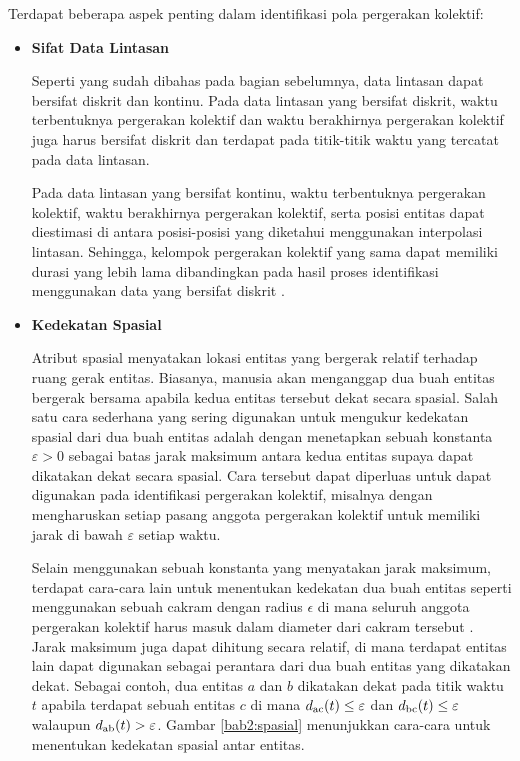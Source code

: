 Terdapat beberapa aspek penting dalam identifikasi pola pergerakan kolektif:

\begin{itemize}
    \item \textbf{Sifat Data Lintasan}
    
    Seperti yang sudah dibahas pada bagian sebelumnya, data lintasan dapat bersifat diskrit dan kontinu. Pada data lintasan yang bersifat diskrit, waktu terbentuknya pergerakan kolektif dan waktu berakhirnya pergerakan kolektif juga harus bersifat diskrit dan terdapat pada titik-titik waktu yang tercatat pada data lintasan.
    
    Pada data lintasan yang bersifat kontinu, waktu terbentuknya pergerakan kolektif, waktu berakhirnya pergerakan kolektif, serta posisi entitas dapat diestimasi di antara posisi-posisi yang diketahui menggunakan interpolasi lintasan. Sehingga, kelompok pergerakan kolektif yang sama dapat memiliki durasi yang lebih lama dibandingkan pada hasil proses identifikasi menggunakan data yang bersifat diskrit \cite{wiratma:trajectory}.
    \item \textbf{Kedekatan Spasial}
    
    Atribut spasial menyatakan lokasi entitas yang bergerak relatif terhadap ruang gerak entitas. Biasanya, manusia akan menganggap dua buah entitas bergerak bersama apabila kedua entitas tersebut dekat secara spasial. Salah satu cara sederhana yang sering digunakan untuk mengukur kedekatan spasial dari dua buah entitas adalah dengan menetapkan sebuah konstanta $\varepsilon > 0$ \iffalse \lionov{pake varepsilon ($\varepsilon$)} \fi sebagai batas jarak maksimum antara kedua entitas supaya dapat dikatakan dekat secara spasial. Cara tersebut dapat diperluas untuk dapat digunakan pada identifikasi pergerakan kolektif, misalnya dengan mengharuskan setiap pasang anggota pergerakan kolektif untuk memiliki jarak di bawah $\varepsilon$ setiap waktu.
    
    Selain menggunakan sebuah konstanta yang menyatakan jarak maksimum, terdapat cara-cara lain untuk menentukan kedekatan dua buah entitas seperti menggunakan sebuah cakram dengan radius $\epsilon$ di mana seluruh anggota pergerakan kolektif harus masuk dalam diameter dari cakram tersebut \cite{gudmundsson:flock}. Jarak maksimum juga dapat dihitung secara relatif, di mana terdapat entitas lain dapat digunakan sebagai perantara dari dua buah entitas yang dikatakan dekat. Sebagai contoh, dua entitas $a$ dan $b$ dikatakan dekat pada titik waktu $t$ apabila terdapat sebuah entitas $c$ di mana $d\textsubscript{ac}(t) \leq \varepsilon$ dan $d\textsubscript{bc}(t) \leq \varepsilon$ walaupun $d\textsubscript{ab}(t) > \varepsilon$. \iffalse \lionov{harus didefinisikan dulu sebelumnya kalo $d_{ac}(t)$ itu menyatakan jarak $a$ dan $c$ pada waktu $t$} \cristopher{udah di bagian \ref{sec:kemiripan} ko} \fi Gambar \ref{bab2:spasial} menunjukkan cara-cara untuk menentukan kedekatan spasial antar entitas.
    

\end{itemize}
